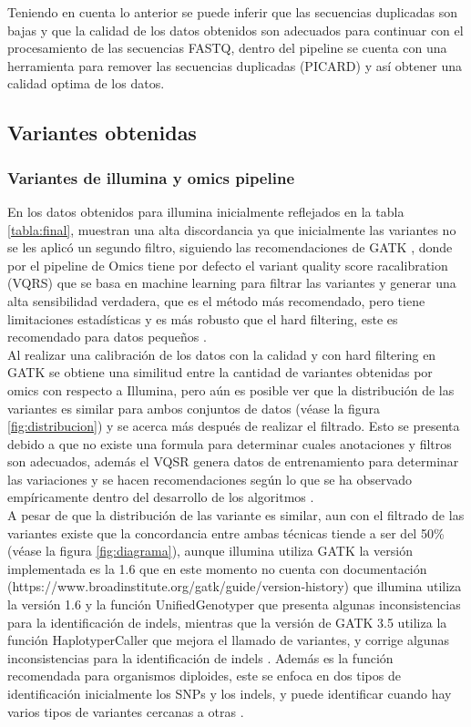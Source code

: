Teniendo en cuenta lo anterior se puede inferir que las secuencias duplicadas son bajas y que la calidad de los datos obtenidos son adecuados para continuar con el procesamiento de las secuencias FASTQ, dentro del pipeline se cuenta con una herramienta para remover las secuencias duplicadas (PICARD) y así obtener una calidad optima de los datos.

\subsection*{Variantes obtenidas}
\subsubsection*{Variantes de illumina y omics pipeline}

En los datos obtenidos para illumina inicialmente reflejados en la tabla \ref{tabla:final}, muestran una alta discordancia ya que inicialmente las variantes no se les aplicó un segundo filtro, siguiendo las recomendaciones de  GATK , donde por el pipeline de Omics tiene por defecto el variant quality score racalibration (VQRS) que se basa en machine learning para filtrar las variantes y generar una alta sensibilidad verdadera, que es el método más recomendado, pero tiene limitaciones estadísticas y es más robusto que el hard filtering, este es recomendado para datos pequeños \cite{Auwera2014}. \\

Al realizar una calibración de los datos con la calidad y con hard filtering en GATK se obtiene una similitud entre la cantidad de variantes obtenidas por omics con respecto a Illumina, pero aún es posible ver que la distribución de las variantes es similar para ambos conjuntos de datos (véase la figura \ref{fig:distribucion}) y se acerca más después de realizar el filtrado. Esto se presenta debido a que no existe una formula para determinar cuales anotaciones y filtros son adecuados, además el VQSR genera datos de entrenamiento para determinar las variaciones y se hacen recomendaciones según lo que se ha observado empíricamente dentro del desarrollo de los algoritmos \cite{Auwera2014}. \\

A pesar de que la distribución de las variante es similar, aun con el filtrado de las variantes existe que la concordancia entre ambas técnicas tiende a ser del 50\% (véase la figura \ref{fig:diagrama}), aunque illumina utiliza GATK la versión implementada es la 1.6 que en este momento no cuenta con documentación (https://www.broadinstitute.org/gatk/guide/version-history) que illumina utiliza la versión 1.6 y la función UnifiedGenotyper que presenta algunas inconsistencias para la identificación de indels, mientras que la versión de GATK 3.5 utiliza la función HaplotyperCaller que mejora el llamado de variantes, y corrige algunas inconsistencias para la identificación de indels \cite{ORawe2013}. Además es la función recomendada para organismos diploides, este se enfoca en dos tipos de identificación inicialmente los SNPs y los indels, y puede identificar cuando hay varios tipos de variantes cercanas a otras \cite{Auwera2014}. \\


